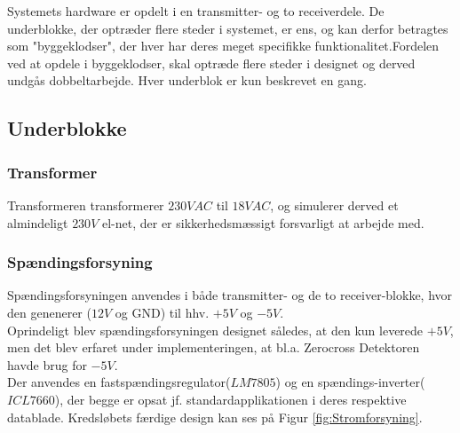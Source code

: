 Systemets hardware er opdelt i en transmitter- og to receiverdele. De underblokke, der optræder flere steder i systemet, er ens, og kan derfor betragtes som "byggeklodser", der hver har deres meget specifikke funktionalitet.Fordelen ved at opdele i byggeklodser, skal optræde flere steder i designet og derved undgås dobbeltarbejde. Hver underblok er kun beskrevet en gang. 

\subsection{Underblokke}

\subsubsection{Transformer}
Transformeren transformerer $230VAC$ til $18V AC$, og simulerer derved et almindeligt $230V$ el-net, der er sikkerhedsmæssigt forsvarligt at arbejde med.

\subsubsection{Spændingsforsyning}
Spændingsforsyningen anvendes i både transmitter- og de to receiver-blokke, hvor den genenerer ($12V$ og GND) til hhv. $+5V$ og $-5V$.\\

Oprindeligt blev spændingsforsyningen designet således, at den kun leverede $+5V$, men det blev erfaret under implementeringen, at bl.a. Zerocross Detektoren havde brug for $-5V$.\\

Der anvendes en fastspændingsregulator($LM7805$)\cite{lib:LM7805} og en spændings-inverter($ICL7660$)\cite{lib:IC7660}, der begge er opsat jf. standardapplikationen i deres respektive datablade. Kredsløbets færdige design kan ses på Figur \ref{fig:Stromforsyning}.

